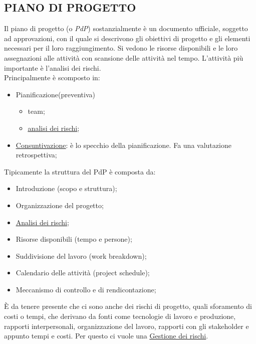 		\subsection{PIANO DI PROGETTO}  \label{piano}
		Il piano di progetto (o \textit{PdP}) sostanzialmente è un documento ufficiale, soggetto ad approvazioni, con il quale si descrivono gli obiettivi di progetto e gli elementi necessari per il loro raggiungimento. Si vedono le risorse disponibili e le loro assegnazioni alle attività con scansione delle attività nel tempo. L'attività più importante è l'analisi dei rischi. \\
		Principalmente è scomposto in:
			\begin{itemize}
				\item Pianificazione(preventiva)
					\begin{itemize}
						\item team;
						\item \underline{\hyperref[analisirischi]{analisi dei rischi}};
					\end{itemize}
				\item \underline{\hyperref[consuntivo]{Consuntivazione}}: è lo specchio della pianificazione. Fa una valutazione retrospettiva;
			\end{itemize}
		Tipicamente la struttura del PdP è composta da:
			\begin{itemize}
				\item Introduzione (scopo e struttura);
				\item Organizzazione del progetto;
				\item \underline{\hyperref[analisirischi]{Analisi dei rischi}};
				\item Risorse disponibili (tempo e persone);
				\item Suddivisione del lavoro (work breakdown);
				\item Calendario delle attività (project schedule);
				\item Meccanismo di controllo e di rendicontazione;
			\end{itemize}
		È da tenere presente che ci sono anche dei rischi di progetto, quali sforamento di costi o tempi, che derivano da fonti come tecnologie di lavoro e produzione, rapporti interpersonali, organizzazione del lavoro, rapporti con gli stakeholder e appunto tempi e costi. Per questo ci vuole una \underline{\hyperref[gestionerischi]{Gestione dei rischi}}. 
		
		
